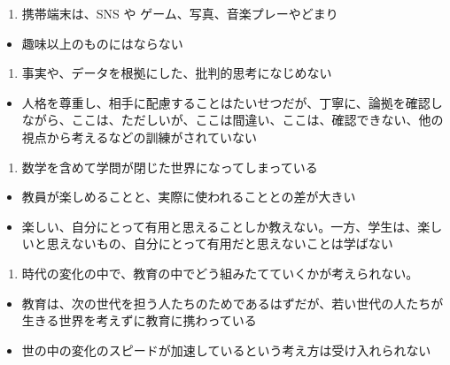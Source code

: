 \documentclass[
]{bxjsbook}
\providecommand{\tightlist}{%
  \setlength{\itemsep}{0pt}\setlength{\parskip}{0pt}}
\theoremstyle{definition}
\theoremstyle{definition}
\theoremstyle{definition}
\theoremstyle{definition}
\theoremstyle{remark}
\begin{document}
\begin{enumerate}
\def\labelenumi{\arabic{enumi}.}
\setcounter{enumi}{4}
\tightlist
\item
  携帯端末は、SNS や ゲーム、写真、音楽プレーやどまり
\end{enumerate}

\begin{itemize}
\tightlist
\item
  趣味以上のものにはならない
\end{itemize}

\begin{enumerate}
\def\labelenumi{\arabic{enumi}.}
\setcounter{enumi}{5}
\tightlist
\item
  事実や、データを根拠にした、批判的思考になじめない
\end{enumerate}

\begin{itemize}
\tightlist
\item
  人格を尊重し、相手に配慮することはたいせつだが、丁寧に、論拠を確認しながら、ここは、ただしいが、ここは間違い、ここは、確認できない、他の視点から考えるなどの訓練がされていない
\end{itemize}

\begin{enumerate}
\def\labelenumi{\arabic{enumi}.}
\setcounter{enumi}{6}
\tightlist
\item
  数学を含めて学問が閉じた世界になってしまっている
\end{enumerate}

\begin{itemize}
\tightlist
\item
  教員が楽しめることと、実際に使われることとの差が大きい
\item
  楽しい、自分にとって有用と思えることしか教えない。一方、学生は、楽しいと思えないもの、自分にとって有用だと思えないことは学ばない
\end{itemize}

\begin{enumerate}
\def\labelenumi{\arabic{enumi}.}
\setcounter{enumi}{7}
\tightlist
\item
  時代の変化の中で、教育の中でどう組みたてていくかが考えられない。
\end{enumerate}

\begin{itemize}
\tightlist
\item
  教育は、次の世代を担う人たちのためであるはずだが、若い世代の人たちが生きる世界を考えずに教育に携わっている
\item
  世の中の変化のスピードが加速しているという考え方は受け入れられない
\end{itemize}
\end{document}
